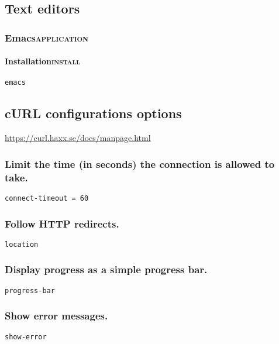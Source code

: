 \documentclass[11pt]{article}
\begin{document}
\subsection{Text editors}
\label{sec:orgc1c08f0}
\subsubsection{Emacs\hfill{}\textsc{application}}
\label{sec:orgf84893f}
\paragraph{Installation\hfill{}\textsc{install}}
\label{sec:orgb36105a}
\begin{verbatim}
emacs
\end{verbatim}

\subsection{cURL configurations options}
\label{sec:org51f3a61}

\url{https://curl.haxx.se/docs/manpage.html}


\subsubsection{Limit the time (in seconds) the connection is allowed to take.}
\label{sec:org9661510}
\begin{verbatim}
connect-timeout = 60
\end{verbatim}
\subsubsection{Follow HTTP redirects.}
\label{sec:org5fdefa3}
\begin{verbatim}
location
\end{verbatim}
\subsubsection{Display progress as a simple progress bar.}
\label{sec:org37691d5}
\begin{verbatim}
progress-bar
\end{verbatim}
\subsubsection{Show error messages.}
\label{sec:orge227c5a}
\begin{verbatim}
show-error
\end{verbatim}
\end{document}
